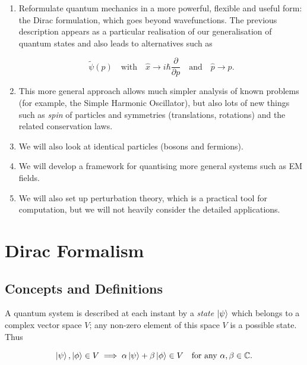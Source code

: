 \documentclass{article}
\begin{document}
\begin{enumerate}

    \item Reformulate quantum mechanics in a more powerful, flexible and useful form: the Dirac formulation, which goes beyond wavefunctions. The previous description appears as a particular realisation of our generalisation of quantum states and also leads to alternatives such as

        \[
            \tilde{\psi}(p)
            \quad \text{with} \quad
            \hat{x} \to i\hbar \frac{\partial}{\partial p}
            \quad \text{and} \quad
            \hat{p} \to p.
        \]

    \item This more general approach allows much simpler analysis of known problems (for example, the Simple Harmonic Oscillator), but also lots of new things such as \textit{spin} of particles and symmetries (translations, rotations) and the related conservation laws.

    \item We will also look at identical particles (bosons and fermions).

    \item We will develop a framework for quantising more general systems such as EM fields.

    \item We will also set up perturbation theory, which is a practical tool for computation, but we will not heavily consider the detailed applications.

\end{enumerate}

\section{Dirac Formalism}

\subsection{Concepts and Definitions}

A quantum system is described at each instant by a \textit{state} $\ket{\psi}$ which belongs to a complex vector space $V$; any non-zero element of this space $V$ is a possible state. Thus

\[
    \ket{\psi}, \ket{\phi} \in V
    \implies
    \alpha\ket{\psi} + \beta\ket{\phi} \in V
    \quad \text{for any } \alpha,\beta \in \mathbb{C}.
\]
\end{document}
